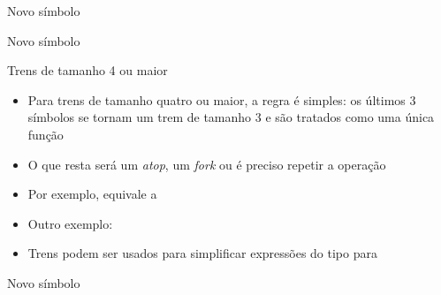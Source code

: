 \begin{frame}[fragile]{Novo símbolo}
\end{frame}

\begin{frame}[fragile]{Novo símbolo}
\end{frame}

\begin{frame}[fragile]{Trens de tamanho 4 ou maior}

    \begin{itemize}
        \item Para trens de tamanho quatro ou maior, a regra é simples: os últimos 3 símbolos se tornam um trem de tamanho 3 e são tratados como uma única função
        \pause

        \item O que resta será um \textit{atop}, um \textit{fork} ou é preciso repetir a operação
        \pause

        \item Por exemplo,   equivale a 
        \pause
        
        \item Outro exemplo:
        \pause

        \item Trens podem ser usados para simplificar expressões do tipo  para 
    \end{itemize}

\end{frame}

\begin{frame}[fragile]{Novo símbolo}


\end{frame}
